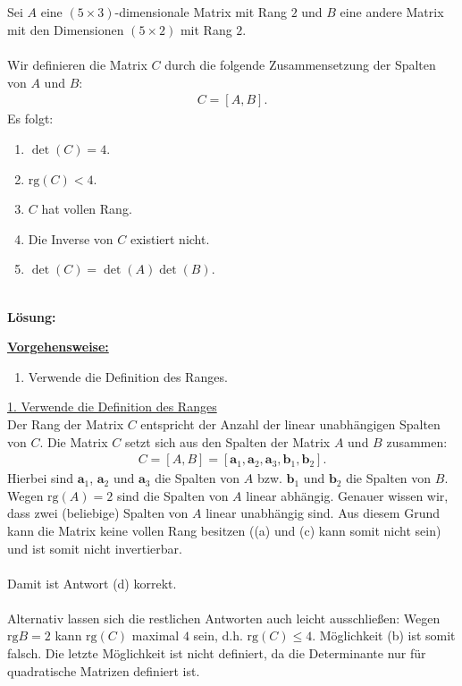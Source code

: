 \subsection*{}
Sei $ A $ eine $ (5 \times 3) $-dimensionale Matrix mit Rang $ 2 $ und $ B $ eine andere Matrix mit den Dimensionen $ (5 \times 2) $ mit Rang $ 2 $.\\
\\
Wir definieren die Matrix $ C $ durch die folgende Zusammensetzung der Spalten von $ A $ und $ B $:
\begin{align*}
	C = [A, B].
\end{align*}
Es folgt:
\renewcommand{\labelenumi}{(\alph{enumi})}
\begin{enumerate}
	\item 
	$ \det(C) = 4$.
	\item
	$ \mathrm{rg}(C) < 4 $.
	\item
	$ C$ hat vollen Rang.
	\item
	Die Inverse von $C$ existiert nicht.
	\item
	$\det(C) = \det(A) \det(B)$.
\end{enumerate}
\ \\
\textbf{Lösung:}
\begin{mdframed}
	\underline{\textbf{Vorgehensweise:}}
	\renewcommand{\labelenumi}{\theenumi.}
	\begin{enumerate}
		\item Verwende die Definition des Ranges.
	\end{enumerate}
\end{mdframed}

\underline{1. Verwende die Definition des Ranges}\\
Der Rang der Matrix $C$ entspricht der Anzahl der linear unabhängigen Spalten von $C$.
Die Matrix $C$ setzt sich aus den Spalten der Matrix $A$ und $B$ zusammen:
\begin{align*}
	C = [A, B] = [ \mathbf{a}_1, \mathbf{a}_2, \mathbf{a}_3,  \mathbf{b}_1, \mathbf{b}_2 ].
\end{align*}
Hierbei sind $\mathbf{a}_1$, $\mathbf{a}_2$ und $\mathbf{a}_3$ die Spalten von $A$ bzw. $\mathbf{b}_1$ und $\mathbf{b}_2$ die Spalten von $ B$.\\
Wegen $\mathrm{rg}(A) = 2$ sind die Spalten von $A$ linear abhängig. Genauer wissen wir, dass zwei (beliebige) Spalten von $A$ linear unabhängig sind. Aus diesem Grund kann die Matrix keine vollen Rang besitzen ((a) und (c) kann somit nicht sein) und ist somit nicht invertierbar.\\
\\
Damit ist Antwort (d) korrekt.\\
\\
Alternativ lassen sich die restlichen Antworten auch leicht ausschließen:
Wegen $\mathrm{rg}{B} = 2$ kann $\mathrm{rg}(C) $ maximal $4$ sein, d.h. $\mathrm{rg}(C) \leq 4$. Möglichkeit (b) ist somit falsch.
Die letzte Möglichkeit ist nicht definiert, da die Determinante nur für quadratische Matrizen definiert ist.



